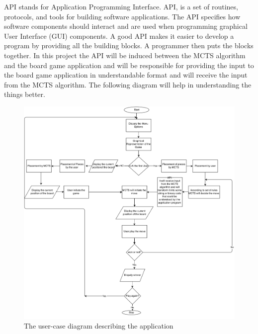 API stands for Application Programming Interface. API, is a set of routines, protocols, and tools for building software applications. The API specifies how software components should interact and are used when programming graphical User Interface (GUI) components. A good API makes it easier to develop a program by providing all the building blocks. A programmer then puts the blocks together.\bigbreak
 In this project the API will be induced between the MCTS algorithm and the board game application and will be responsible for providing the input to the board game application in understandable format and will receive the input from the MCTS algorithm. The following diagram will help in understanding the things better.

\bigbreak

\begin{figure}[H]
\centering
\includegraphics[width=\textwidth]{2General_Architecture/2.2API/img/DiagramAPI.png}
\caption{The user-case diagram describing the application}
\label{fig:pieces}
\end{figure}


